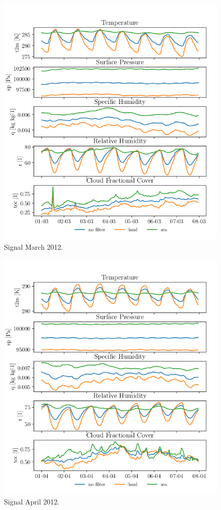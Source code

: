 \begin{figure}[ht]
    \centering
    \includegraphics{python_figs/spatially_averaged_one_week_from_2012-03-01.png}
    \caption{Signal March 2012.}
    \label{fig:mar12}
\end{figure}

\begin{figure}[ht]
    \centering
    \includegraphics{python_figs/spatially_averaged_one_week_from_2012-04-01.png}
    \caption{Signal April 2012.}
    \label{fig:april12}
\end{figure}

